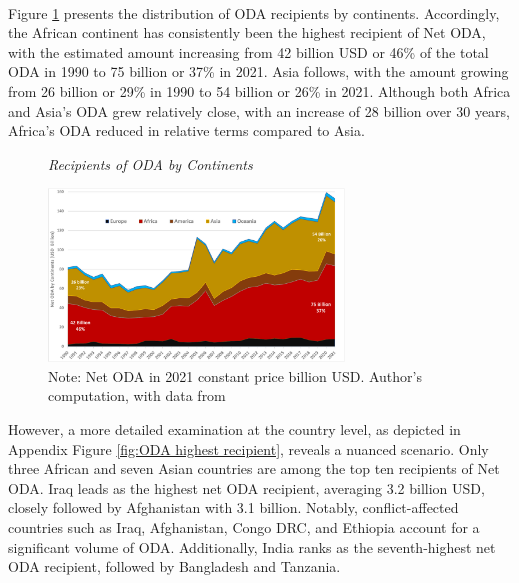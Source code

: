 \paragraph{} Figure \ref{fig:ODA by continent} presents the distribution of ODA recipients by continents. Accordingly, the African continent has consistently been the highest recipient of Net ODA, with the estimated amount increasing from 42 billion USD or 46\% of the total ODA in 1990 to 75 billion or 37\% in 2021. Asia follows, with the amount growing from 26 billion or 29\% in 1990 to 54 billion or 26\% in 2021. Although both Africa and Asia's ODA grew relatively close, with an increase of 28 billion over 30 years, Africa's ODA reduced in relative terms compared to Asia.

\begin{figure}[ht]
\captionsetup{justification=justified,singlelinecheck=false}
\caption{\textit{Recipients of ODA by Continents}}
\vspace{4pt}
    \centering \includegraphics[width = 0.7\textwidth]{Figures/ODA_Graphs/Dist_ODA_by_continents.pdf}
    \caption*{\footnotesize{Note: Net ODA in 2021 constant price billion USD. Author's computation, with data from \textcite{oecd_Data_2023}}}
    \label{fig:ODA by continent}
\end{figure}


However, a more detailed examination at the country level, as depicted in Appendix Figure \ref{fig:ODA highest recipient}, reveals a nuanced scenario. Only three African and seven Asian countries are among the top ten recipients of Net ODA. Iraq leads as the highest net ODA recipient, averaging 3.2 billion USD, closely followed by Afghanistan with 3.1 billion. Notably, conflict-affected countries such as Iraq, Afghanistan, Congo DRC, and Ethiopia account for a significant volume of ODA. Additionally, India ranks as the seventh-highest net ODA recipient, followed by Bangladesh and Tanzania.






